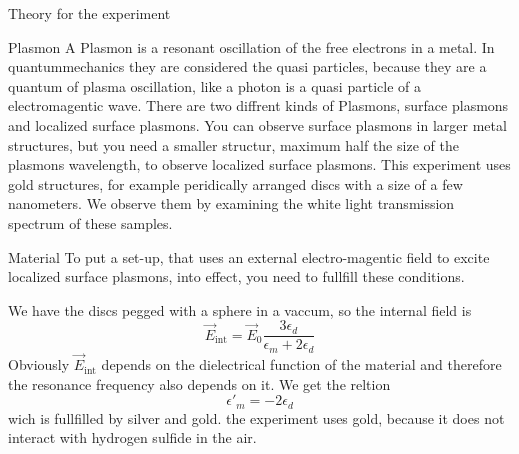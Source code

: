 \documentclass[pdftex, a4paper,11pt, twoside, UKenglish]{report}
\begin{document}
  
  
  
  
  
  
  
  
  
  \tableofcontents
  
  
  
  \begin{chapter}{Theory for the experiment}
    \label{chp:Theory}
    
    \begin{section}{Plasmon}
        A Plasmon is a resonant oscillation of the free electrons in a metal.
        In quantummechanics they are considered the quasi particles, because
        they are a quantum of plasma oscillation, like a photon is a quasi
        particle of a electromagentic wave.
        There are two diffrent kinds of Plasmons, surface plasmons and localized
        surface plasmons.
        You can observe surface plasmons in larger metal structures, but you
        need a smaller structur, maximum half the size of the plasmons
        wavelength, to observe localized surface plasmons.  
        This experiment uses gold structures, for example peridically arranged
        discs with a size of a few nanometers.
        We observe them by examining the white light transmission spectrum of
        these samples.

    \end{section}
    
    \begin{section}{Material}
        To put a set-up, that uses an external electro-magentic field to excite
        localized surface plasmons, into effect, you need to fullfill these
        conditions.

        We have the discs pegged with a sphere in a vaccum, so the internal
        field is
        \[
            \vec{E}_\text{int} = \vec E_0\frac{3\epsilon_d}
            {\epsilon_m+2\epsilon_d}
        \]
        Obviously $\vec E_\text{int}$ depends on the dielectrical function of
        the material and therefore the resonance frequency also depends on it.
        We get the reltion
        \[
            \epsilon'_m = -2\epsilon_d
        \]
        wich is fullfilled by silver and gold.
        the experiment uses gold, because it does not interact with hydrogen
        sulfide in the air.


\end{section}
\end{chapter}
\end{document}
